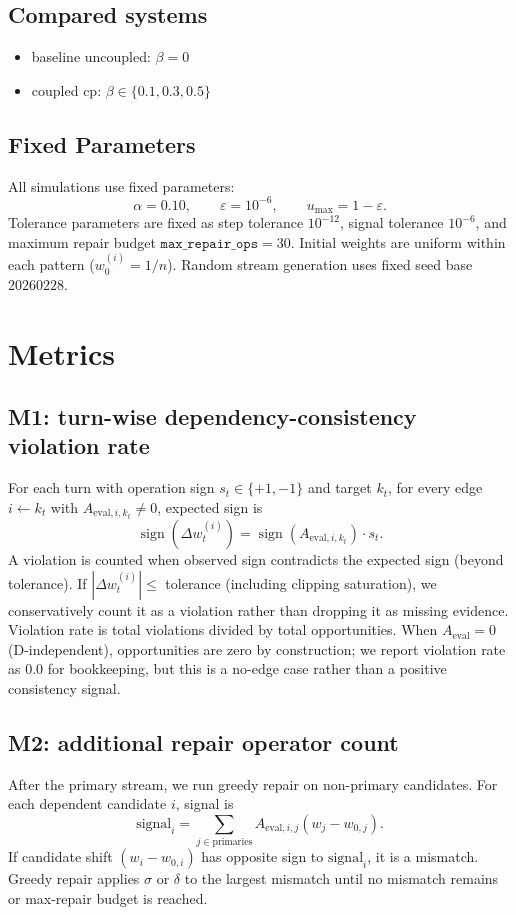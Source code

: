 \documentclass[11pt,a4paper]{article}
\begin{document}
\subsection{Compared systems}
\begin{itemize}
  \item baseline uncoupled: \(\beta=0\)
  \item coupled cp: \(\beta\in\{0.1,0.3,0.5\}\)
\end{itemize}

\subsection{Fixed Parameters}
All simulations use fixed parameters:
\[
\alpha=0.10,\qquad \varepsilon=10^{-6},\qquad u_{\max}=1-\varepsilon.
\]
Tolerance parameters are fixed as step tolerance \(10^{-12}\), signal tolerance \(10^{-6}\), and maximum repair budget \(\texttt{max\_repair\_ops}=30\).
Initial weights are uniform within each pattern (\(w_0^{(i)}=1/n\)).
Random stream generation uses fixed seed base \(20260228\).

\section{Metrics}
\subsection{M1: turn-wise dependency-consistency violation rate}
For each turn with operation sign \(s_t\in\{+1,-1\}\) and target \(k_t\), for every edge \(i\leftarrow k_t\) with \(A_{\text{eval},i,k_t}\neq 0\), expected sign is
\[
\operatorname{sign}(\Delta w_t^{(i)}) = \operatorname{sign}(A_{\text{eval},i,k_t})\cdot s_t.
\]
A violation is counted when observed sign contradicts the expected sign (beyond tolerance). If \(|\Delta w_t^{(i)}|\le\) tolerance (including clipping saturation), we conservatively count it as a violation rather than dropping it as missing evidence.
Violation rate is total violations divided by total opportunities.
When \(A_{\text{eval}}=0\) (D-independent), opportunities are zero by construction; we report violation rate as 0.0 for bookkeeping, but this is a no-edge case rather than a positive consistency signal.

\subsection{M2: additional repair operator count}
After the primary stream, we run greedy repair on non-primary candidates.
For each dependent candidate \(i\), signal is
\[
\text{signal}_i = \sum_{j\in\text{primaries}} A_{\text{eval},i,j}(w_j-w_{0,j}).
\]
If candidate shift \((w_i-w_{0,i})\) has opposite sign to \(\text{signal}_i\), it is a mismatch.
Greedy repair applies \(\sigma\) or \(\delta\) to the largest mismatch until no mismatch remains or max-repair budget is reached.
\end{document}
